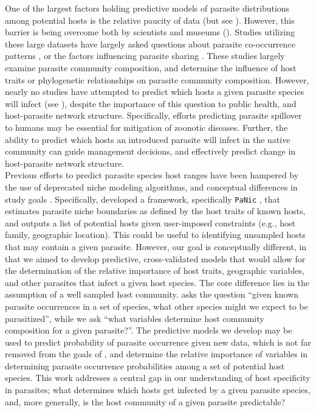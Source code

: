 \documentclass[12pt]{article}
\begin{document}

One of the largest factors holding predictive models of parasite distributions among potential hosts is the relative paucity of data (but see \cite{}). However, this barrier is being overcome both by scientists \cite{strona2012, nunn2005} and museums (\cite{gibson2005}). Studies utilizing these large datasets have largely asked questions about parasite co-occurrence patterns \cite{strona2013}, or the factors influencing parasite sharing \cite{braga2014, dallas2014b}. These studies largely examine parasite community composition, and determine the influence of host traits or phylogenetic relationships on parasite community composition. However, nearly no studies have attempted to predict which hosts a given parasite species will infect (see \cite{strona2012panic}), despite the importance of this question to public health, and host-parasite network structure. Specifically, efforts predicting parasite spillover to humans may be essential for mitigation of zoonotic diseases. Further, the ability to predict which hosts an introduced parasite will infect in the native community can guide management decisions, and effectively predict change in host-parasite network structure. \\

Previous efforts to predict parasite species host ranges have been hampered by the use of deprecated niche modeling algorithms, and conceptual differences in study goals \citep{strona2012}. Specifically, \citet{strona2012} developed a framework, specifically \texttt{PaNic} \citep{strona2012panic}, that estimates parasite niche boundaries as defined by the host traits of known hosts, and outputs a list of potential hosts given user-imposed constraints (e.g., host family, geographic location). This could be useful to identifying unsampled hosts that may contain a given parasite. However, our goal is conceptually different, in that we aimed to develop predictive, cross-validated models that would allow for the determination of the relative importance of host traits, geographic variables, and other parasites that infect a given host species. The core difference lies in the assumption of a well sampled host community. \citet{strona2012panic} asks the question ``given known parasite occurrences in a set of species, what other species might we expect to be parasitized'', while we ask ``what variables determine host community composition for a given parasite?''. The predictive models we develop may be used to predict probability of parasite occurrence given new data, which is not far removed from the goals of \citet{strona2012panic}, and determine the relative importance of variables in determining parasite occurrence probabilities among a set of potential host species. This work addresses a central gap in our understanding of host specificity in parasites; what determines which hosts get infected by a given parasite species, and, more generally, is the host community of a given parasite predictable? \\ 
 
\end{document}
